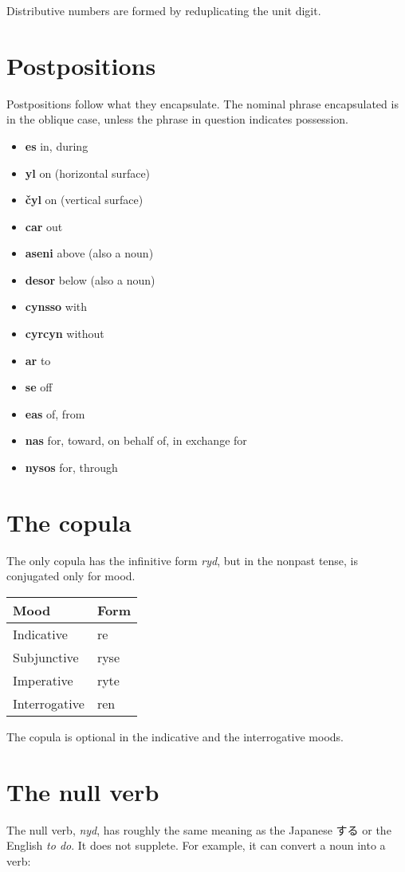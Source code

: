 \documentclass{book}
\newcommand{\qa}[2]{\item \textbf{#1} #2}
\begin{document}
Distributive numbers are formed by reduplicating the unit digit.

\section{Postpositions}

Postpositions follow what they encapsulate. The nominal phrase encapsulated is in the oblique case, unless the phrase in question indicates possession.


\begin{itemize}
  \qa{es}{in, during}
  \qa{yl}{on (horizontal surface)}
  \qa{čyl}{on (vertical surface)}
  \qa{car}{out}
  \qa{aseni}{above} (also a noun)
  \qa{desor}{below} (also a noun)
  \qa{cynsso}{with}
  \qa{cyrcyn}{without}
  \qa{ar}{to}
  \qa{se}{off}
  \qa{eas}{of, from}
  \qa{nas}{for, toward, on behalf of, in exchange for}
  \qa{nysos}{for, through}
\end{itemize}

\section{The copula}

The only copula has the infinitive form \emph{ryd}, but in the nonpast tense, is conjugated only for mood.

\begin{center}
	\begin{tabular}{|l|l|}
		\hline
		Mood & Form \\ \hline
		Indicative & re \\
		Subjunctive & ryse \\
		Imperative & ryte \\
		Interrogative & ren \\ \hline
	\end{tabular}
\end{center}

The copula is optional in the indicative and the interrogative moods.

\section{The null verb}

The null verb, \emph{nyd}, has roughly the same meaning as the Japanese \textsf{する} or the English \emph{to do}. It does not supplete. For example, it can convert a noun into a verb:
\end{document}

